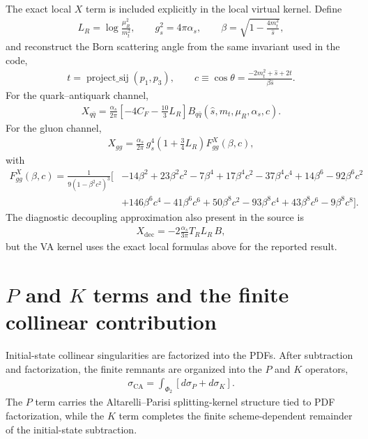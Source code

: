 \documentclass[11pt]{article}
\begin{document}
The exact local $X$ term is included explicitly in the local virtual kernel. Define
\begin{align}
L_R=\log\frac{\mu_R^2}{m_t^2},
\qquad
g_s^2=4\pi\alpha_s,
\qquad
\beta=\sqrt{1-\frac{4m_t^2}{\hat s}},
\end{align}
and reconstruct the Born scattering angle from the same invariant used in the code,
\begin{align}
t=\operatorname{project\_sij}(p_1,p_3),
\qquad
c\equiv\cos\theta=\frac{-2m_t^2+\hat s+2t}{\beta\hat s}.
\end{align}
For the quark--antiquark channel,
\begin{align}
X_{q\bar q}=\frac{\alpha_s}{2\pi}
\left[-4C_F-\frac{10}{3}L_R\right]B_{q\bar q}(\hat s,m_t,\mu_R,\alpha_s,c).
\end{align}
For the gluon channel,
\begin{align}
X_{gg}=\frac{\alpha_s}{2\pi}\,g_s^4\left(1+\frac34L_R\right)F^X_{gg}(\beta,c),
\end{align}
with
\begin{align}
F^X_{gg}(\beta,c)=
\frac{1}{9(1-\beta^2c^2)^3}
\Big[&-14\beta^2+23\beta^2c^2
-7\beta^4+17\beta^4c^2-37\beta^4c^4
+14\beta^6-92\beta^6c^2\\
&+146\beta^6c^4-41\beta^6c^6
+50\beta^8c^2-93\beta^8c^4
+43\beta^8c^6-9\beta^8c^8\Big].
\end{align}
The diagnostic decoupling approximation also present in the source is
\begin{align}
X_{\text{dec}}=-2\frac{\alpha_s}{3\pi}T_RL_R\,B,
\end{align}
but the VA kernel uses the exact local formulas above for the reported result.

\section{\texorpdfstring{$P$ and $K$}{P and K} terms and the finite collinear contribution}

Initial-state collinear singularities are factorized into the PDFs. After subtraction and factorization, the finite remnants are organized into the $P$ and $K$ operators,
\begin{align}
\sigma_{\text{CA}} = \int_{\Phi_2} \left[d\sigma_P + d\sigma_K\right].
\end{align}
The $P$ term carries the Altarelli--Parisi splitting-kernel structure tied to PDF factorization,
while the $K$ term completes the finite scheme-dependent remainder of the initial-state subtraction.
\end{document}
